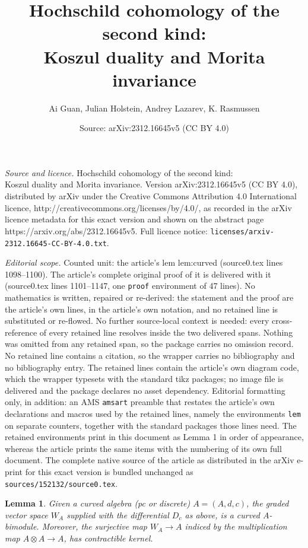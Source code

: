 \documentclass[10pt,a4paper]{amsart}
\title{Hochschild cohomology of the second kind:\\ Koszul duality and Morita invariance}
\author{Ai Guan, Julian Holstein, Andrey Lazarev, K. Rasmussen}
\date{Source: arXiv:2312.16645v5 (CC BY 4.0)}
\newtheorem{lem}{Lemma}
\begin{document}
\maketitle

\noindent\emph{Source and licence.} Hochschild cohomology of the second kind:\\ Koszul duality and Morita invariance. Version arXiv:2312.16645v5 (CC BY 4.0), distributed by arXiv under the Creative Commons Attribution 4.0 International licence, http://creativecommons.org/licenses/by/4.0/, as recorded in the arXiv licence metadata for this exact version and shown on the abstract page https://arxiv.org/abs/2312.16645v5. Full licence notice: \texttt{licenses/arxiv-2312.16645-CC-BY-4.0.txt}.\par\smallskip

\noindent\textit{Editorial scope.} Counted unit: the article's lem lem:curved (source0.tex lines 1098--1100). The article's complete original proof of it is delivered with it (source0.tex lines 1101--1147, one \texttt{proof} environment of 47 lines). No mathematics is written, repaired or re-derived: the statement and the proof are the article's own lines, in the article's own notation, and no retained line is substituted or re-flowed.  No further source-local context is needed: every cross-reference of every retained line resolves inside the two delivered spans.  Nothing was omitted from any retained span, so the package carries no omission record.  No retained line contains a citation, so the wrapper carries no bibliography and no bibliography entry.  The retained lines contain the article's own diagram code, which the wrapper typesets with the standard tikz packages; no image file is delivered and the package declares no asset dependency.  Editorial formatting only, in addition: an AMS \texttt{amsart} preamble that restates the article's own declarations and macros used by the retained lines, namely the environments \texttt{lem} on separate counters, together with the standard packages those lines need.  The retained environments print in this document as Lemma 1 in order of appearance, whereas the article prints the same items with the numbering of its own full document.  The complete native source of the article as distributed in the arXiv e-print for this exact version is bundled unchanged as \texttt{sources/152132/source0.tex}.
\begin{lem}\label{lem:curved}
	Given a curved algebra (pc or discrete) $A=(A,d,c)$, the graded vector space $W_A$ supplied with the differential $D_c$ as above, is a curved $A$-bimodule.	Moreover, the surjective map $W_A\to A$ indiced by the multiplication map $A\otimes A\to A$, has contractible kernel. 
\end{lem}
\end{document}
